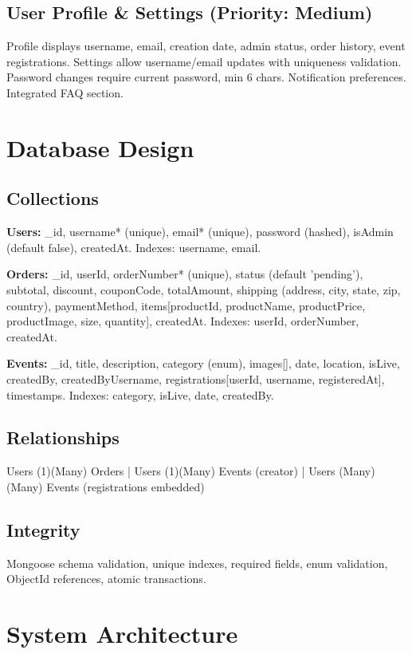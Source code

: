 ﻿\documentclass[11pt]{article}
\begin{document}
\subsection{User Profile \& Settings (Priority: Medium)}
Profile displays username, email, creation date, admin status, order history, event registrations. Settings allow username/email updates with uniqueness validation. Password changes require current password, min 6 chars. Notification preferences. Integrated FAQ section.

\section{Database Design}

\subsection{Collections}
\textbf{Users:} \_id, username* (unique), email* (unique), password (hashed), isAdmin (default false), createdAt. Indexes: username, email.

\textbf{Orders:} \_id, userId, orderNumber* (unique), status (default 'pending'), subtotal, discount, couponCode, totalAmount, shipping (address, city, state, zip, country), paymentMethod, items[productId, productName, productPrice, productImage, size, quantity], createdAt. Indexes: userId, orderNumber, createdAt.

\textbf{Events:} \_id, title, description, category (enum), images[], date, location, isLive, createdBy, createdByUsername, registrations[userId, username, registeredAt], timestamps. Indexes: category, isLive, date, createdBy.

\subsection{Relationships}
Users (1)(Many) Orders | Users (1)(Many) Events (creator) | Users (Many)(Many) Events (registrations embedded)

\subsection{Integrity}
Mongoose schema validation, unique indexes, required fields, enum validation, ObjectId references, atomic transactions.

\section{System Architecture}
\end{document}
